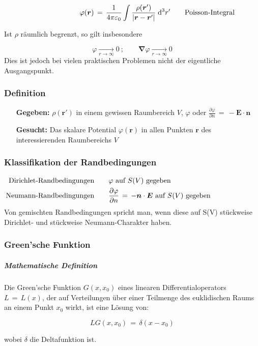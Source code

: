 \documentclass[titlepage,11pt,a4paper,ngerman]{report}
\renewcommand{\vec}[1]{\boldsymbol{#1}}
\renewcommand{\epsilon}{\varepsilon}
\newcommand{\vabla}{\boldsymbol{\nabla}}
\renewcommand{\paragraph}[1]{\subsubsection{#1}}
\begin{document}
\[\varphi(\vec{r})\,=\,\frac{1}{4\pi\epsilon_0}\int\frac{\rho(\vec{r}')}{\left|\vec{r}-\vec{r}'\right|}\;\mathrm{d}^3r'\qquad\rlap{Poisson-Integral}\]

Ist $\rho$ räumlich begrenzt, so gilt insbesondere

\[\varphi\xrightarrow[r\rightarrow\infty]{}0\ ;\qquad\vabla\varphi\xrightarrow[r\rightarrow\infty]{}0\]
\noindent
Dies ist jedoch bei vielen praktischen Problemen nicht der eigentliche Ausgangspunkt.

\paragraph{Definition}
\begin{itemize}[leftmargin=3cm]
	\item[\textbf{Gegeben:}] $\rho(\vec{r}')$ in einem gewissen Raumbereich $V$, $\varphi$ oder $\frac{\partial\varphi}{\partial n}\,=\,-\vec{E}\cdot \vec{n}$
	\item[\textbf{Gesucht:}] Das skalare Potential $\varphi(\vec{r})$ in allen Punkten $\vec{r}$ des interessierenden Raumbereichs $V$
\end{itemize}

\paragraph{Klassifikation der Randbedingungen}
\begin{align*}\hspace{2cm}
\llap{Dirichlet-Randbedingungen}\qquad&\varphi\ \text{auf}\ S(V)\ \text{gegeben}\\
\llap{Neumann-Randbedingungen}\qquad&\frac{\partial\varphi}{\partial n}\,=\,-\vec{n}\cdot\vec{E}\ \text{auf}\ S(V)\ \text{gegeben}
\end{align*}
\noindent
Von gemischten Randbedingungen spricht man, wenn diese auf S(V) stückweise Dirichlet- und stückweise Neumann-Charakter haben.

\paragraph{Green'sche Funktion}
\subparagraph{Mathematische Definition}
Die Green'sche Funktion $G(x, x_0)$ eines linearen Differentialoperators $L\,=\,L(x)$, der auf Verteilungen über einer Teilmenge des euklidischen Raums an einem Punkt $x_0$ wirkt, ist eine Lösung von:

\[LG(x,x_0)\,=\,\delta(x-x_0)\]

wobei $\delta$ die Deltafunktion ist.
\end{document}
